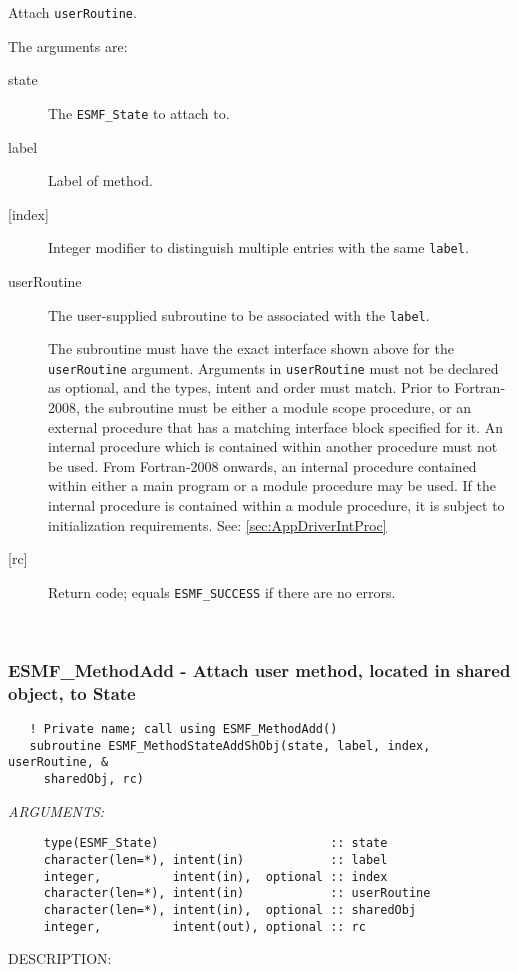    Attach {\tt userRoutine}.
  
   The arguments are:
   \begin{description}
   \item[state]
     The {\tt ESMF\_State} to attach to.
   \item[label]
     Label of method.
   \item[{[index]}]
     Integer modifier to distinguish multiple entries with the same {\tt label}.
   \item[userRoutine]
     The user-supplied subroutine to be associated with the {\tt label}.
  
     The subroutine must have the exact interface shown above
     for the {\tt userRoutine} argument. Arguments in {\tt userRoutine}
     must not be declared as optional, and the types, intent and order must
     match.
     Prior to Fortran-2008, the subroutine must be either a module scope procedure,
     or an external procedure that has a matching interface block specified for it.
     An internal procedure which is contained within another procedure must not be used.
     From Fortran-2008 onwards, an internal procedure contained within either a main program
     or a module procedure may be used.  If the internal procedure is contained within a
     module procedure, it is subject to initialization requirements.  See: \ref{sec:AppDriverIntProc}
   \item[{[rc]}]
     Return code; equals {\tt ESMF\_SUCCESS} if there are no errors.
   \end{description}
   
 
\mbox{}\hrulefill\ 
 
\subsubsection [ESMF\_MethodAdd] {ESMF\_MethodAdd - Attach user method, located in shared object, to State}


  
\begin{verbatim}   ! Private name; call using ESMF_MethodAdd()
   subroutine ESMF_MethodStateAddShObj(state, label, index, userRoutine, &
     sharedObj, rc)\end{verbatim}{\em ARGUMENTS:}
\begin{verbatim}     type(ESMF_State)                        :: state
     character(len=*), intent(in)            :: label
     integer,          intent(in),  optional :: index
     character(len=*), intent(in)            :: userRoutine
     character(len=*), intent(in),  optional :: sharedObj
     integer,          intent(out), optional :: rc \end{verbatim}
{\sf DESCRIPTION:\\ }


